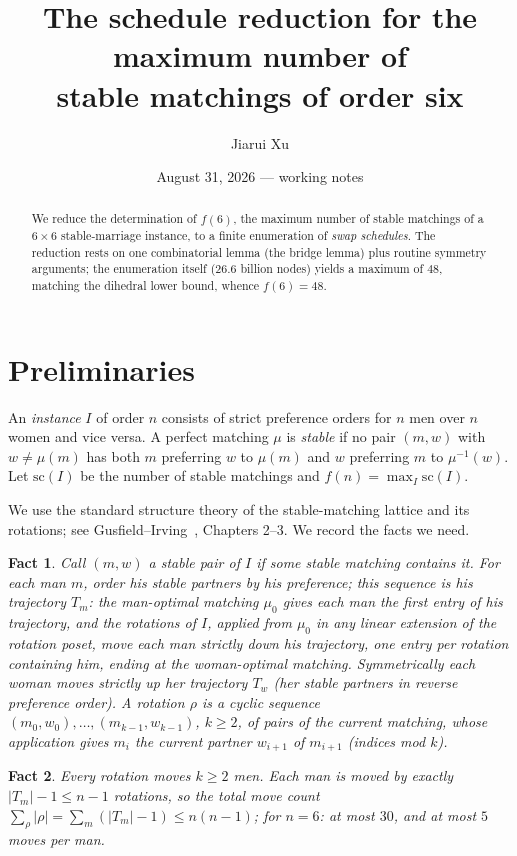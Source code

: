 \documentclass[11pt]{article}
\title{The schedule reduction for the maximum number of\\ stable matchings of order six}
\author{Jiarui Xu}
\date{August 31, 2026 --- working notes}
\newtheorem{fact}{Fact}
\begin{document}
\maketitle

\begin{abstract}
We reduce the determination of $f(6)$, the maximum number of stable matchings of a
$6\times 6$ stable-marriage instance, to a finite enumeration of \emph{swap schedules}.
The reduction rests on one combinatorial lemma (the bridge lemma) plus routine symmetry
arguments; the enumeration itself (26.6 billion nodes) yields a maximum of $48$,
matching the dihedral lower bound, whence $f(6)=48$.
\end{abstract}

\section{Preliminaries}

An \emph{instance} $I$ of order $n$ consists of strict preference orders for $n$ men over
$n$ women and vice versa. A perfect matching $\mu$ is \emph{stable} if no pair $(m,w)$
with $w\ne\mu(m)$ has both $m$ preferring $w$ to $\mu(m)$ and $w$ preferring $m$ to
$\mu^{-1}(w)$. Let $\mathrm{sc}(I)$ be the number of stable matchings and
$f(n)=\max_I \mathrm{sc}(I)$.

We use the standard structure theory of the stable-matching lattice and its rotations;
see Gusfield--Irving~\cite{gi89}, Chapters 2--3. We record the facts we need.

\begin{fact}\label{fact:pairs}
Call $(m,w)$ a \emph{stable pair} of $I$ if some stable matching contains it. For each
man $m$, order his stable partners by his preference; this sequence is his
\emph{trajectory} $T_m$: the man-optimal matching $\mu_0$ gives each man the first entry
of his trajectory, and the rotations of $I$, applied from $\mu_0$ in any linear
extension of the rotation poset, move each man strictly down his trajectory, one entry
per rotation containing him, ending at the woman-optimal matching. Symmetrically each
woman moves strictly up her trajectory $T_w$ (her stable partners in reverse preference
order). A rotation $\rho$ is a cyclic sequence $(m_0,w_0),\dots,(m_{k-1},w_{k-1})$,
$k\ge 2$, of pairs of the current matching, whose application gives $m_i$ the current
partner $w_{i+1}$ of $m_{i+1}$ (indices mod $k$).
\end{fact}

\begin{fact}\label{fact:budget}
Every rotation moves $k\ge 2$ men. Each man is moved by exactly $|T_m|-1\le n-1$
rotations, so the total move count $\sum_\rho |\rho| = \sum_m (|T_m|-1)\le n(n-1)$;
for $n=6$: at most $30$, and at most $5$ moves per man.
\end{fact}
\end{document}
